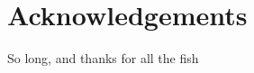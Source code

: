 \documentclass[%
    corpo=11pt,
    twoside, %
    oldstyle,
    autoretitolo,
    greek,
    evenboxes,
   tipotesi = frontespizio,
]{toptesi}
\begin{document}


  \figurespagetrue   %
  \indici	             %









%
%



\backmatter



\printbibliography[heading=bibintoc]

\chapter*{Acknowledgements}
\thispagestyle{empty}

So long, and thanks for all the fish





\end{document}
